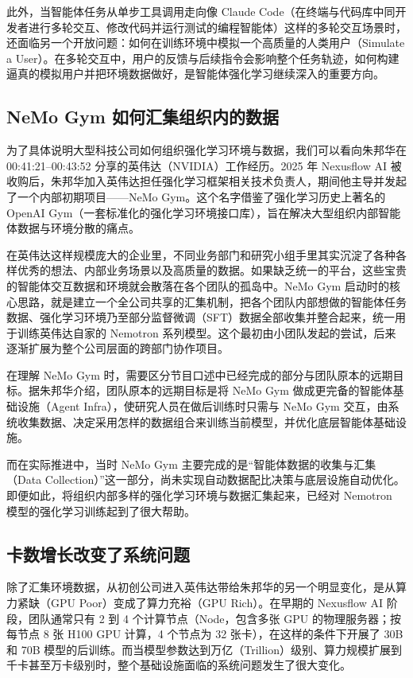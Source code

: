 \documentclass[UTF8,a4paper,11pt,fontset=fandol]{ctexart}
\begin{document}
此外，当智能体任务从单步工具调用走向像 Claude Code（在终端与代码库中同开发者进行多轮交互、修改代码并运行测试的编程智能体）这样的多轮交互场景时，还面临另一个开放问题：如何在训练环境中模拟一个高质量的人类用户（Simulate a User）。在多轮交互中，用户的反馈与后续指令会影响整个任务轨迹，如何构建逼真的模拟用户并把环境数据做好，是智能体强化学习继续深入的重要方向。

\subsection{NeMo Gym 如何汇集组织内的数据}
为了具体说明大型科技公司如何组织强化学习环境与数据，我们可以看向朱邦华在 00:41:21–00:43:52 分享的英伟达（NVIDIA）工作经历。2025 年 Nexusflow AI 被收购后，朱邦华加入英伟达担任强化学习框架相关技术负责人，期间他主导并发起了一个内部初期项目——NeMo Gym。这个名字借鉴了强化学习历史上著名的 OpenAI Gym（一套标准化的强化学习环境接口库），旨在解决大型组织内部智能体数据与环境分散的痛点。

在英伟达这样规模庞大的企业里，不同业务部门和研究小组手里其实沉淀了各种各样优秀的想法、内部业务场景以及高质量的数据。如果缺乏统一的平台，这些宝贵的智能体交互数据和环境就会散落在各个团队的孤岛中。NeMo Gym 启动时的核心思路，就是建立一个全公司共享的汇集机制，把各个团队内部想做的智能体任务数据、强化学习环境乃至部分监督微调（SFT）数据全部收集并整合起来，统一用于训练英伟达自家的 Nemotron 系列模型。这个最初由小团队发起的尝试，后来逐渐扩展为整个公司层面的跨部门协作项目。

在理解 NeMo Gym 时，需要区分节目口述中已经完成的部分与团队原本的远期目标。据朱邦华介绍，团队原本的远期目标是将 NeMo Gym 做成更完备的智能体基础设施（Agent Infra），使研究人员在做后训练时只需与 NeMo Gym 交互，由系统收集数据、决定采用怎样的数据组合来训练当前模型，并优化底层智能体基础设施。

而在实际推进中，当时 NeMo Gym 主要完成的是“智能体数据的收集与汇集（Data Collection）”这一部分，尚未实现自动数据配比决策与底层设施自动优化。即便如此，将组织内部多样的强化学习环境与数据汇集起来，已经对 Nemotron 模型的强化学习训练起到了很大帮助。

\subsection{卡数增长改变了系统问题}
除了汇集环境数据，从初创公司进入英伟达带给朱邦华的另一个明显变化，是从算力紧缺（GPU Poor）变成了算力充裕（GPU Rich）。在早期的 Nexusflow AI 阶段，团队通常只有 2 到 4 个计算节点（Node，包含多张 GPU 的物理服务器；按每节点 8 张 H100 GPU 计算，4 个节点为 32 张卡），在这样的条件下开展了 30B 和 70B 模型的后训练。而当模型参数达到万亿（Trillion）级别、算力规模扩展到千卡甚至万卡级别时，整个基础设施面临的系统问题发生了很大变化。
\end{document}
